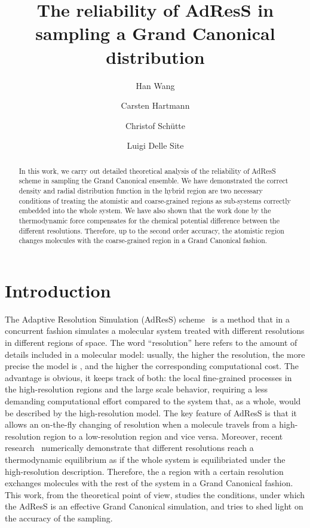 \documentclass[aip,jcp,a4paper,reprint,onecolumn]{revtex4-1}
\begin{document}
\title{The reliability of AdResS in sampling a Grand Canonical distribution}
\author{Han Wang}
\author{Carsten Hartmann}
\author{Christof Sch\"utte}
\author{Luigi Delle Site}

\begin{abstract}
  In this work, we carry out detailed theoretical analysis of the
  reliability of AdResS scheme in sampling the Grand Canonical
  ensemble. We have demonstrated the correct density and radial distribution
  function in the hybrid region are two necessary conditions of
  treating the atomistic and coarse-grained regions as sub-systems
  correctly embedded into the whole system.  We have also shown that the
  work done by the thermodynamic force compensates for the chemical
  potential difference between the different resolutions. Therefore,
  up to the second order accuracy, the atomistic region changes
  molecules with the coarse-grained region in a Grand Canonical
  fashion.
\end{abstract}

\maketitle

\section{Introduction}
The Adaptive Resolution Simulation (AdResS) scheme~\cite{jcp,pre} is a
method that in a concurrent fashion simulates a molecular system treated with different
resolutions in different regions of space.  The word ``resolution''
here refers to the amount of details included in a molecular model: usually, the higher the
resolution, the more precise the model is , and the higher the corresponding computational cost.  The advantage is obvious, it
keeps track of both: the local fine-grained processes in the
high-resolution regions and the large scale behavior, requiring a less demanding computational effort compared to the system that, as a
whole, would be described by the high-resolution model. The key feature of
AdResS is that it allows an on-the-fly changing of resolution when a
molecule travels from a high-resolution region to a low-resolution
region and vice versa. Moreover, recent research~\cite{prlgc, rdfcorr}
numerically demonstrate that different resolutions reach a
thermodynamic equilibrium as if the whole system is equilibriated
under the high-resolution description. Therefore, the a region with a
certain resolution exchanges molecules with the rest of the system in
a Grand Canonical fashion. This work, from the theoretical point of
view, studies the conditions, under which the AdResS is an effective
Grand Canonical simulation, and tries to shed light on the accuracy of
the sampling.
\end{document}
